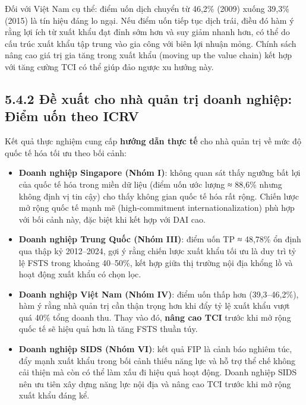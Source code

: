 \documentclass[
  a4paper,
  13pt]{extreport}
\begin{document}
Đối với Việt Nam cụ thể: điểm uốn dịch chuyển từ 46,2\% (2009) xuống
39,3\% (2015) là tín hiệu đáng lo ngại. Nếu điểm uốn tiếp tục dịch trái,
điều đó hàm ý rằng lợi ích từ xuất khẩu đạt đỉnh sớm hơn và suy giảm
nhanh hơn, có thể do cấu trúc xuất khẩu tập trung vào gia công với biên
lợi nhuận mỏng. Chính sách nâng cao giá trị gia tăng trong xuất khẩu
(moving up the value chain) kết hợp với tăng cường TCI có thể giúp đảo
ngược xu hướng này.

\hypertarget{ux111ux1ec1-xuux1ea5t-cho-nhuxe0-quux1ea3n-trux1ecb-doanh-nghiux1ec7p-ux111iux1ec3m-uux1ed1n-theo-icrv}{%
\subsection{5.4.2 Đề xuất cho nhà quản trị doanh nghiệp: Điểm uốn theo
ICRV}\label{ux111ux1ec1-xuux1ea5t-cho-nhuxe0-quux1ea3n-trux1ecb-doanh-nghiux1ec7p-ux111iux1ec3m-uux1ed1n-theo-icrv}}

Kết quả thực nghiệm cung cấp \textbf{hướng dẫn thực tế} cho nhà quản trị
về mức độ quốc tế hóa tối ưu theo bối cảnh:

\begin{itemize}
\item
  \textbf{Doanh nghiệp Singapore (Nhóm I)}: không quan sát thấy ngưỡng
  bất lợi của quốc tế hóa trong miền dữ liệu (điểm uốn ước lượng ≈
  88,6\% nhưng không định vị tin cậy) cho thấy không gian quốc tế hóa
  rất rộng. Chiến lược mở rộng quốc tế mạnh mẽ (high-commitment
  internationalization) phù hợp với bối cảnh này, đặc biệt khi kết hợp
  với DAI cao.
\item
  \textbf{Doanh nghiệp Trung Quốc (Nhóm III)}: điểm uốn TP ≈ 48,78\% ổn
  định qua thập kỷ 2012--2024, gợi ý rằng chiến lược xuất khẩu tối ưu là
  duy trì tỷ lệ FSTS trong khoảng 40--50\%, kết hợp giữa thị trường nội
  địa khổng lồ và hoạt động xuất khẩu có chọn lọc.
\item
  \textbf{Doanh nghiệp Việt Nam (Nhóm IV)}: điểm uốn thấp hơn
  (39,3--46,2\%), hàm ý rằng nhà quản trị cần thận trọng hơn khi đẩy tỷ
  lệ xuất khẩu vượt quá 40\% tổng doanh thu. Thay vào đó, \textbf{nâng
  cao TCI} trước khi mở rộng quốc tế sẽ hiệu quả hơn là tăng FSTS thuần
  túy.
\item
  \textbf{Doanh nghiệp SIDS (Nhóm VI)}: kết quả FIP là cảnh báo nghiêm
  túc, đẩy mạnh xuất khẩu trong bối cảnh thiếu năng lực và hỗ trợ thể
  chế không cải thiện mà còn có thể làm xấu đi hiệu quả hoạt động. Doanh
  nghiệp SIDS nên ưu tiên xây dựng năng lực nội địa và nâng cao TCI
  trước khi mở rộng xuất khẩu đáng kể.
\end{itemize}
\end{document}
